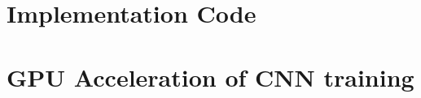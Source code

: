 \documentclass[Main]{subfiles}
\begin{document}
\section{Implementation Code} %
	\label{sec:code}





\section{GPU Acceleration of CNN training} %
	\label{sec:gpu_acceleration_of_cnn_training}




\end{document}
